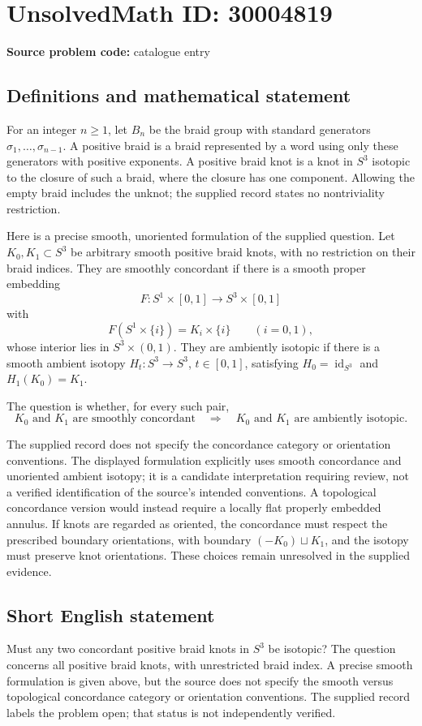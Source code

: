 \documentclass[11pt]{article}
\begin{document}
\section*{UnsolvedMath ID: 30004819}
\textbf{Source problem code:} catalogue entry
\subsection{Definitions and mathematical statement}
For an integer \(n\geq 1\), let \(B_n\) be the braid group with standard generators \(\sigma_1,\ldots,\sigma_{n-1}\). A positive braid is a braid represented by a word using only these generators with positive exponents. A positive braid knot is a knot in \(S^3\) isotopic to the closure of such a braid, where the closure has one component. Allowing the empty braid includes the unknot; the supplied record states no nontriviality restriction.

Here is a precise smooth, unoriented formulation of the supplied question. Let \(K_0,K_1\subset S^3\) be arbitrary smooth positive braid knots, with no restriction on their braid indices. They are smoothly concordant if there is a smooth proper embedding
\[
F:S^1\times[0,1]\longrightarrow S^3\times[0,1]
\]
with
\[
F(S^1\times\{i\})=K_i\times\{i\}\qquad(i=0,1),
\]
whose interior lies in \(S^3\times(0,1)\). They are ambiently isotopic if there is a smooth ambient isotopy \(H_t:S^3\to S^3\), \(t\in[0,1]\), satisfying \(H_0=\operatorname{id}_{S^3}\) and \(H_1(K_0)=K_1\).

The question is whether, for every such pair,
\[
K_0\text{ and }K_1\text{ are smoothly concordant}
\quad\Longrightarrow\quad
K_0\text{ and }K_1\text{ are ambiently isotopic}.
\]

The supplied record does not specify the concordance category or orientation conventions. The displayed formulation explicitly uses smooth concordance and unoriented ambient isotopy; it is a candidate interpretation requiring review, not a verified identification of the source's intended conventions. A topological concordance version would instead require a locally flat properly embedded annulus. If knots are regarded as oriented, the concordance must respect the prescribed boundary orientations, with boundary \((-K_0)\sqcup K_1\), and the isotopy must preserve knot orientations. These choices remain unresolved in the supplied evidence.
\subsection{Short English statement}
Must any two concordant positive braid knots in \(S^3\) be isotopic? The question concerns all positive braid knots, with unrestricted braid index. A precise smooth formulation is given above, but the source does not specify the smooth versus topological concordance category or orientation conventions. The supplied record labels the problem open; that status is not independently verified.
\end{document}
